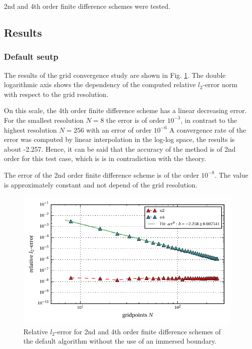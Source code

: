 2nd and 4th order finite difference schemes were tested.

\clearpage

\subsection{Results}
\subsubsection{Default seutp}

The results of the grid convergence study are shown in Fig. \ref{fig:ema1}.
The double logarithmic axis shows the dependency of the computed relative $l_2$-error norm
with respect to the grid resolution.

On this scale, the 4th order finite difference scheme has a linear decreasing error.
For the smallest resolution $N=8$ the error is of order $10^{-3}$,
in contrast to the highest resolution $N=256$ with an error of order $10^{-6}$
A convergence rate of the error  was computed by linear interpolation in the log-log space,
the results is about -2.257.
Hence, it can be said that the accuracy of the method is of 2nd order for this test case,
which is is in contradiction with the theory.

The error of the 2nd order finite difference scheme is of the order $10^{-8}$.
The value is approximately constant and not depend of the grid resolution.

\begin{figure}[!bp]
    \centering
    \includegraphics{gfx/immersed_boundary/poiseuille_flow/1_default/relative_l2error.pdf}
    \caption{Relative $l_2$-error for 2nd and 4th order finite difference schemes of the default algorithm without the use of an immersed boundary.\label{fig:ema1}}
\end{figure}

